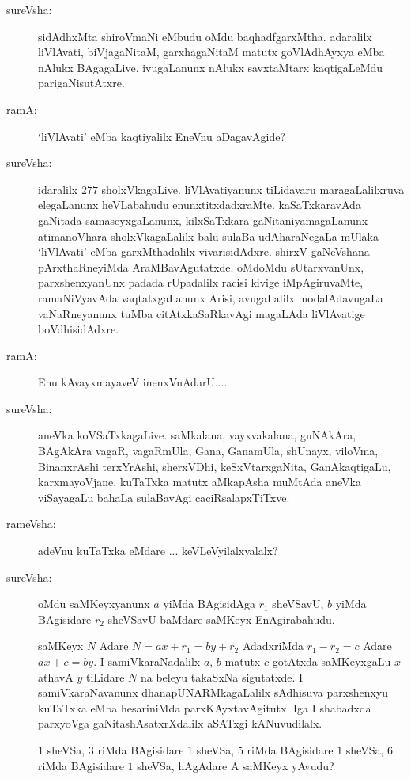 \begin{description}
\item[sureVsha:] sidAdhxMta shiroVmaNi eMbudu oMdu baqhadfgarxMtha. adaralilx liVlAvati, biVjagaNitaM, garxhagaNitaM matutx goVlAdhAyxya eMba nAlukx BAgagaLive. ivugaLanunx nAlukx savxtaMtarx kaqtigaLeMdu parigaNisutAtxre.

\item[ramA:] `liVlAvati' eMba kaqtiyalilx EneVnu aDagavAgide?

\item[sureVsha:] idaralilx $277$ sholxVkagaLive. liVlAvatiyanunx tiLidavaru maragaLalilxruva elegaLanunx heVLabahudu enunxtitxdadxraMte. kaSaTxkaravAda gaNitada samaseyxgaLanunx, kilxSaTxkara gaNitaniyamagaLanunx atimanoVhara sholxVkagaLalilx balu sulaBa udAharaNegaLa mUlaka `liVlAvati' eMba garxMthadalilx vivarisidAdxre. shirxV gaNeVshana pArxthaRneyiMda AraMBavAgutatxde. oMdoMdu sUtarxvanUnx, parxshenxyanUnx padada rUpadalilx racisi kivige iMpAgiruvaMte, ramaNiVyavAda vaqtatxgaLanunx Arisi, avugaLalilx modalAdavugaLa vaNaRneyanunx tuMba citAtxkaSaRkavAgi magaLAda liVlAvatige boVdhisidAdxre.

\item[ramA:] Enu kAvayxmayaveV inenxVnAdarU....

\item[sureVsha:] aneVka koVSaTxkagaLive. saMkalana, vayxvakalana, guNAkAra, BAgAkAra vagaR, vagaRmUla, Gana, GanamUla, shUnayx, viloVma, BinanxrAshi terxYrAshi, sherxVDhi, keSxVtarxgaNita, GanAkaqtigaLu, karxmayoVjane, kuTaTxka matutx aMkapAsha muMtAda aneVka viSayagaLu bahaLa sulaBavAgi caciRsalapxTiTxve.

\item[rameVsha:] adeVnu kuTaTxka eMdare ... keVLeVyilalxvalalx?

\item[sureVsha:] oMdu saMKeyxyanunx $a$ yiMda BAgisidAga $r_{1}$ sheVSavU, $b$ yiMda BAgisidare $r_{2}$ sheVSavU baMdare saMKeyx EnAgirabahudu.

saMKeyx $N$ Adare $N=ax+r_{1}=by+r_{2}$ AdadxriMda $r_{1}-r_{2}=c$ Adare $ax+c=by$. I samiVkaraNadalilx $a$, $b$ matutx $c$ gotAtxda saMKeyxgaLu $x$ athavA $y$ tiLidare $N$ na beleyu takaSxNa sigutatxde. I samiVkaraNavanunx dhanapUNARMkagaLalilx sAdhisuva parxshenxyu kuTaTxka eMba hesariniMda parxKAyxtavAgitutx. Iga I shabadxda parxyoVga gaNitashAsatxrXdalilx aSATxgi kANuvudilalx.

$1$ sheVSa, $3$ riMda BAgisidare $1$ sheVSa, $5$ riMda BAgisidare $1$ sheVSa, $6$ riMda BAgisidare $1$ sheVSa, hAgAdare A saMKeyx yAvudu?


\end{description}
